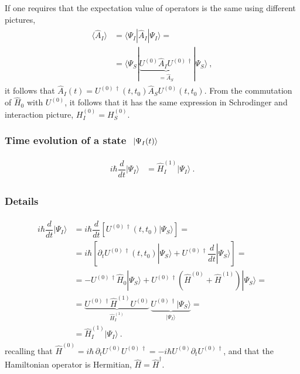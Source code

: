 \documentclass[letterpaper,10pt,english]{jupyterBook}
\begin{document}
\sphinxAtStartPar
If one requires that the expectation value of operators is the same using different pictures,
\begin{equation*}
\begin{split}\begin{aligned}
  \langle \hat{A}_I \rangle
  & = \langle \Psi_I | \hat{A}_I | \Psi_I \rangle = \\
  & = \langle \Psi_S | \underbrace{U^{(0)} \hat{A}_I U^{(0) \, \dagger}}_{=\hat{A}_S} | \Psi_S \rangle \ ,
\end{aligned}\end{split}
\end{equation*}
\sphinxAtStartPar
it follows that \(\hat{A}_I(t) = U^{(0) \, \dagger}(t,t_0) \hat{A}_S U^{(0)}(t,t_0)\). From the commutation of \(\hat{H}_0\) with \(U^{(0)}\), it follows that it has the same expression in Schrodinger and interaction picture, \(H^{(0)}_I = H^{(0)}_S\).

\sphinxAtStartPar
{}
\subsubsection*{Time evolution of a state \protect\(\ | \Psi_I(t) \rangle\protect\)}
\begin{equation*}
\begin{split}\begin{aligned}
  i \hbar \dfrac{d}{dt} | \Psi_I \rangle 
  & = \hat{H}^{(1)}_I | \Psi_I \rangle \ .
\end{aligned}\end{split}
\end{equation*}\subsubsection*{Details}
\begin{equation*}
\begin{split}\begin{aligned}
  i \hbar \dfrac{d}{dt} | \Psi_I \rangle 
  & = i \hbar \dfrac{d}{dt} \left[ U^{(0) \, \dagger}(t,t_0) | \Psi_S \rangle  \right] = \\
  & = i \hbar \left[ \partial_t U^{(0) \, \dagger}(t,t_0) | \Psi_S \rangle + U^{(0) \, \dagger} \dfrac{d}{dt} | \Psi_S \rangle  \right] = \\
  & = - U^{(0) \, \dagger} \hat{H}_0 | \Psi_S \rangle + U^{(0) \, \dagger} \left( \hat{H}^{(0)} + \hat{H}^{(1)} \right) | \Psi_S \rangle = \\
  & = \underbrace{U^{(0) \, \dagger} \hat{H}^{(1)} U^{(0)}}_{\hat{H}^{(1)}_I} \, \underbrace{U^{(0) \, \dagger} | \Psi_S \rangle}_{| \Psi_I \rangle} = \\
  & = \hat{H}^{(1)}_I | \Psi_I \rangle \ .
\end{aligned}\end{split}
\end{equation*}
\sphinxAtStartPar
recalling that \(\hat{H}^{(0)} = i \hbar \, \partial_t U^{(0)} U^{(0) \, \dagger} = - i \hbar U^{(0)} \partial_t U^{(0) \, \dagger}\), and that the Hamiltonian operator is Hermitian, \(\hat{H} = \hat{H}^{\dagger}\).
\end{document}
